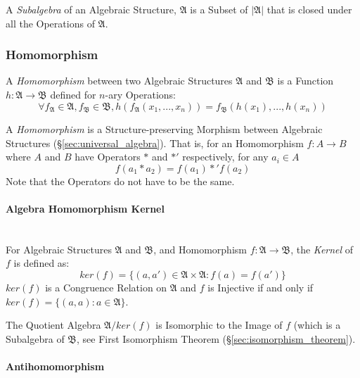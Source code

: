 A \emph{Subalgebra} of an Algebraic Structure, $\mathfrak{A}$ is a Subset of
$|\mathfrak{A}|$ that is closed under all the Operations of $\mathfrak{A}$.



\subsubsection{Homomorphism}\label{sec:homomorphism}

A \emph{Homomorphism} between two Algebraic Structures $\mathfrak{A}$ and
$\mathfrak{B}$ is a Function $h: \mathfrak{A} \rightarrow \mathfrak{B}$ defined
for $n$-ary Operations:
\[
  \forall f_\mathfrak{A} \in \mathfrak{A}, f_\mathfrak{B} \in
  \mathfrak{B}, h(f_\mathfrak{A}(x_1, ..., x_n)) =
  f_\mathfrak{B}(h(x_1), ..., h(x_n))
\]


A \emph{Homomorphism} is a Structure-preserving Morphism between Algebraic
Structures (\S\ref{sec:universal_algebra}). That is, for an Homomorphism $f : A
\rightarrow B$ where $A$ and $B$ have Operators $*$ and $*'$ respectively, for
any $a_i \in A$
\[
  f(a_1 * a_2) = f(a_1) *' f(a_2)
\]
\fist Note that the Operators do not have to be the same.



\paragraph{Algebra Homomorphism Kernel}\hfill
\label{sec:algebra_homomorphism_kernel} \hfill \\

For Algebraic Structures $\mathfrak{A}$ and $\mathfrak{B}$, and Homomorphism
$f: \mathfrak{A} \rightarrow \mathfrak{B}$, the \emph{Kernel} of $f$ is defined
as:
\[
    ker(f) = \{ (a,a') \in \mathfrak{A} \times \mathfrak{A} : f(a) = f(a') \}
\]
$ker(f)$ is a Congruence Relation on $\mathfrak{A}$ and $f$ is Injective if and
only if $ker(f) = \{(a,a) : a \in \mathfrak{A}\}$.

The Quotient Algebra $\mathfrak{A}/ker(f)$ is Isomorphic to the Image of $f$
(which is a Subalgebra of $\mathfrak{B}$, see First Isomorphism Theorem
(\S\ref{sec:isomorphism_theorem}).



\paragraph{Antihomomorphism}\label{sec:antihomomorphism}\hfill

